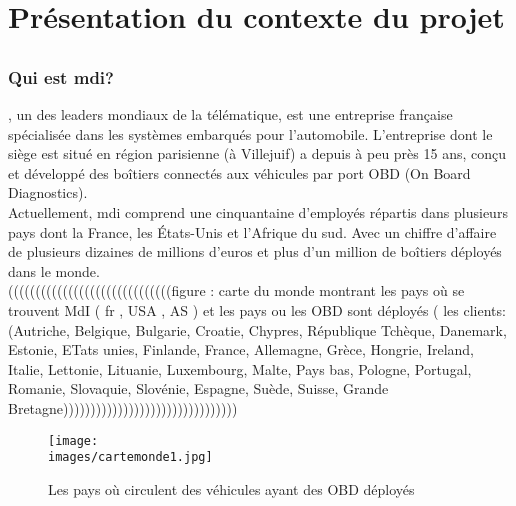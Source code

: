 \section{Présentation du contexte du projet}
    \subsection{\company{}}
        \subsubsection{Qui est \texorpdfstring{\gls{mdi}}{MDI}?}
            \company{}\cite{mdi_site}, un des leaders mondiaux de la télématique, est une entreprise
            française spécialisée dans les systèmes embarqués pour l'automobile.
            L’entreprise dont le siège est situé en région parisienne (à Villejuif) a depuis à peu près
            15 ans, conçu et développé des boîtiers connectés aux véhicules par port OBD (On
            Board Diagnostics).\\
            Actuellement, \gls{mdi} comprend une cinquantaine d’employés répartis dans plusieurs
            pays dont la France, les États-Unis et l’Afrique du sud. Avec un chiffre d’affaire de
            plusieurs dizaines de millions d’euros et plus d’un million de boîtiers déployés dans le
            monde.\\


            ((((((((((((((((((((((((((((((figure : carte du monde montrant les pays où se trouvent MdI ( fr , USA , AS ) et les 
            pays ou les OBD sont déployés ( les clients:  (Autriche, Belgique, Bulgarie, Croatie, Chypres, République Tchèque, Danemark, Estonie, ETats unies, Finlande, France, Allemagne, Grèce, Hongrie, Ireland, Italie, Lettonie, Lituanie, Luxembourg, Malte, Pays bas, Pologne, Portugal, Romanie, Slovaquie, Slovénie, Espagne, Suède, Suisse, Grande Bretagne))))))))))))))))))))))))))))))))
            \begin{figure}[ht]
                \centering
                \texttt{[image: \\images/cartemonde1.jpg]}
                \caption{Les pays où circulent des véhicules ayant des OBD déployés }
            \end{figure}


